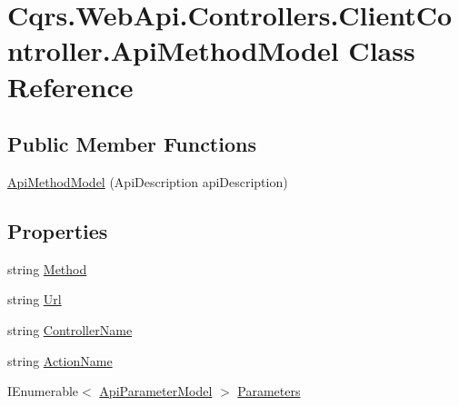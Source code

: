 \hypertarget{classCqrs_1_1WebApi_1_1Controllers_1_1ClientController_1_1ApiMethodModel}{}\section{Cqrs.\+Web\+Api.\+Controllers.\+Client\+Controller.\+Api\+Method\+Model Class Reference}
\label{classCqrs_1_1WebApi_1_1Controllers_1_1ClientController_1_1ApiMethodModel}
\subsection*{Public Member Functions}
\begin{DoxyCompactItemize}
\item 
\hyperlink{classCqrs_1_1WebApi_1_1Controllers_1_1ClientController_1_1ApiMethodModel_a6d1bf1c1016565c5ca50c6591dc7f9c1}{Api\+Method\+Model} (Api\+Description api\+Description)
\end{DoxyCompactItemize}
\subsection*{Properties}
\begin{DoxyCompactItemize}
\item 
string \hyperlink{classCqrs_1_1WebApi_1_1Controllers_1_1ClientController_1_1ApiMethodModel_ae5e755bb50395fb205f2fef1e0996c9c}{Method}
\item 
string \hyperlink{classCqrs_1_1WebApi_1_1Controllers_1_1ClientController_1_1ApiMethodModel_acc052a6baebad1db57f1cae2dcc79261}{Url}
\item 
string \hyperlink{classCqrs_1_1WebApi_1_1Controllers_1_1ClientController_1_1ApiMethodModel_a3d87deeca069fb2c77a65d7f554e8a53}{Controller\+Name}
\item 
string \hyperlink{classCqrs_1_1WebApi_1_1Controllers_1_1ClientController_1_1ApiMethodModel_a9c87230b81015b0c331f1a7177ff23d2}{Action\+Name}
\item 
I\+Enumerable$<$ \hyperlink{classCqrs_1_1WebApi_1_1Controllers_1_1ClientController_1_1ApiParameterModel}{Api\+Parameter\+Model} $>$ \hyperlink{classCqrs_1_1WebApi_1_1Controllers_1_1ClientController_1_1ApiMethodModel_a0da38a890013a8363ae1a2361de1c45b}{Parameters}
\end{DoxyCompactItemize}


